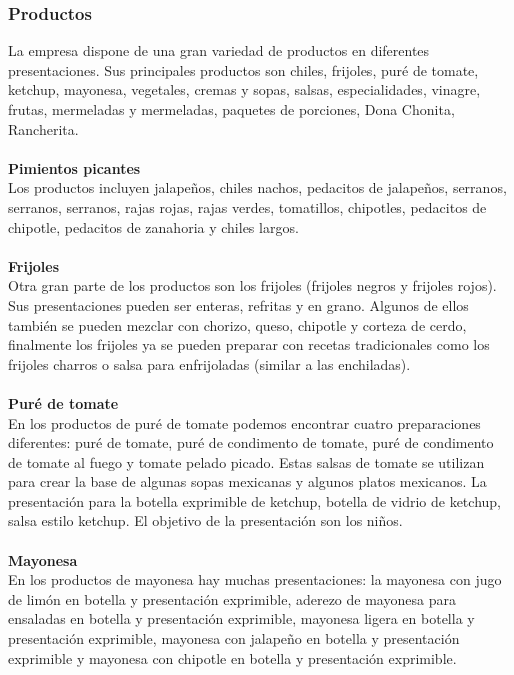 \documentclass[12pt,letterpaper]{article}
\begin{document}
\subsubsection{Productos}
La empresa dispone de una gran variedad de productos en diferentes presentaciones. Sus principales productos son chiles, frijoles, puré de 
tomate, ketchup, mayonesa, vegetales, cremas y sopas, salsas, especialidades, vinagre, frutas, mermeladas y mermeladas, paquetes de porciones, 
Dona Chonita, Rancherita.
\\ \\
\textbf{Pimientos picantes} 
\\
Los productos incluyen jalapeños, chiles nachos, pedacitos de jalapeños, serranos, serranos, serranos, rajas rojas, rajas verdes, tomatillos, 
chipotles, pedacitos de chipotle, pedacitos de zanahoria y chiles largos.
\\ \\
\textbf{Frijoles} 
\\
Otra gran parte de los productos son los frijoles (frijoles negros y frijoles rojos). Sus presentaciones pueden ser enteras, refritas y en grano. 
Algunos de ellos también se pueden mezclar con chorizo, queso, chipotle y corteza de cerdo, finalmente los frijoles ya se pueden preparar con 
recetas tradicionales como los frijoles charros o salsa para enfrijoladas (similar a las enchiladas). 
\\ \\
\textbf{Puré de tomate} 
\\
En los productos de puré de tomate podemos encontrar cuatro preparaciones diferentes: puré de tomate, puré de condimento de tomate, puré de 
condimento de tomate al fuego y tomate pelado picado. Estas salsas de tomate se utilizan para crear la base de algunas sopas mexicanas y 
algunos platos mexicanos. La presentación para la botella exprimible de ketchup, botella de vidrio de ketchup, salsa estilo ketchup. El 
objetivo de la presentación son los niños.
\\ \\
\textbf{Mayonesa} 
\\
En los productos de mayonesa hay muchas presentaciones: la mayonesa con jugo de limón en botella y presentación exprimible, aderezo de 
mayonesa para ensaladas en botella y presentación exprimible, mayonesa ligera en botella y presentación exprimible, mayonesa con jalapeño 
en botella y presentación exprimible y mayonesa con chipotle en botella y presentación exprimible.
\\ \\
\end{document}
